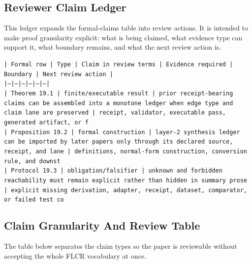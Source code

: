 \documentclass[11pt]{article}
\begin{document}
\subsection*{Reviewer Claim Ledger}

This ledger expands the formal-claims table into review actions. It is intended to make proof granularity explicit: what is being claimed, what evidence type can support it, what boundary remains, and what the next review action is.

\noindent\texttt{| Formal row | Type | Claim in review terms | Evidence required | Boundary | Next review action |}\\
\noindent\texttt{|---|---|---|---|---|---|}\\
\noindent\texttt{| Theorem 19.1 | finite/executable result | prior receipt-bearing claims can be assembled into a monotone ledger when edge type and claim lane are preserved | receipt, validator, executable pass, generated artifact, or f}\\
\noindent\texttt{| Proposition 19.2 | formal construction | layer-2 synthesis ledger can be imported by later papers only through its declared source, receipt, and lane | definitions, normal-form construction, conversion rule, and downst}\\
\noindent\texttt{| Protocol 19.3 | obligation/falsifier | unknown and forbidden reachability must remain explicit rather than hidden in summary prose | explicit missing derivation, adapter, receipt, dataset, comparator, or failed test co}\\

\subsection*{Claim Granularity And Review Table}

The table below separates the claim types so the paper is reviewable without accepting the whole FLCR vocabulary at once.
\end{document}
